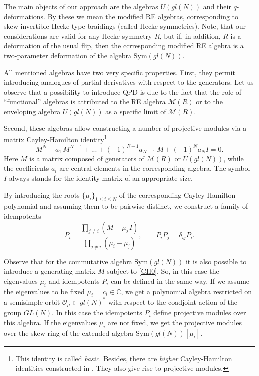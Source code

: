 \documentclass[10pt,a4paper]{amsart}
\newcommand{\MM}{\mathcal{M}}
\newcommand{\C}{\mathbb{C}}
\numberwithin{equation}{section}
\begin{document}
The main objects of our approach are the algebras $U(gl(N))$ and their $q$-deformations. By these we mean the modified RE algebras,
corresponding to skew-invertible Hecke type braidings (called Hecke symmetries). Note, that our considerations are valid for any Hecke
symmetry $R$, but if, in addition, $R$ is a deformation of the usual flip, then the corresponding modified RE algebra is a two-parameter
deformation of the algebra $\mathrm{Sym}(gl(N))$.

All mentioned algebras have two very specific properties. First, they permit introducing analogues of partial derivatives with respect to
the generators. Let us observe  that a possibility to introduce QPD is due to the fact that the role of  ``functional'' algebras is attributed
to the RE algebra $\MM(R)$ or to the enveloping algebra $U(gl(N))$ as a specific limit of $\MM(R)$.

Second, these algebras allow constructing a number of projective modules via a matrix Cayley-Hamilton identity\footnote{This identity
is called \emph{basic}. Besides, there are \emph{higher} Cayley-Hamilton identities constructed in \cite{GS0}. They also give rise
to projective modules.}
\begin{equation}
M^N-a_1\, M^{N-1}+...+(-1)^{N-1} a_{N-1}\, M+(-1)^{N} a_N I=0.
\label{CH0}
\end{equation}
Here $M$ is a matrix composed of generators of $\MM(R)$ or $U(gl(N))$, while the coefficients $a_i$ are central elements in
the corresponding algebra. The symbol $I$ always stands for the identity matrix of an appropriate size.

By introducing the roots $\{\mu_i\}_{1\leq i\leq N}$ of the corresponding Cayley-Hamilton polynomial and assuming them to be pairwise
distinct, we construct a family of idempotents
\begin{equation}
P_i=\frac{\prod_{j\not=i} (M-\mu_j\, I)}{\prod_{j\not=i}(\mu_i-\mu_j)}, \qquad P_iP_j = \delta_{ij}P_i.
\label{Idem}
\end{equation}

Observe that for  the commutative algebra $\mathrm{Sym}(gl(N))$ it is also possible to introduce a  generating matrix $M$
subject to \eqref{CH0}. So, in this case  the eigenvalues $\mu_i$ and  idempotents $P_i$ can be defined in the same way. If we assume
the eigenvalues to be fixed $\mu_i=c_i\in \C$, we get a polynomial algebra restricted on a semisimple orbit 
$\mathcal{O}_\mu\subset gl(N)^*$ with respect to the coadjoint action of the group $GL(N)$. In this case the idempotents $P_i$ define projective modules over this algebra. If the eigenvalues $\mu_i$
are not fixed, we get the projective modules  over the skew-ring of  the extended algebra $\mathrm{Sym}(gl(N))[\mu_i]$.
\end{document}
